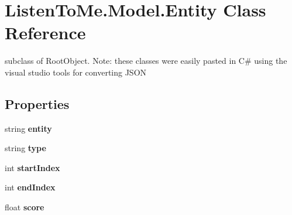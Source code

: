 \hypertarget{class_listen_to_me_1_1_model_1_1_entity}{}\section{Listen\+To\+Me.\+Model.\+Entity Class Reference}
\label{class_listen_to_me_1_1_model_1_1_entity}


subclass of Root\+Object. Note\+: these classes were easily pasted in C\# using the visual studio tools for converting J\+S\+ON  


\subsection*{Properties}
\begin{DoxyCompactItemize}
\item 
string {\bfseries entity}\hypertarget{class_listen_to_me_1_1_model_1_1_entity_a4ae17435557f0e0ec97ff0a93f791f63}{}\label{class_listen_to_me_1_1_model_1_1_entity_a4ae17435557f0e0ec97ff0a93f791f63}

\item 
string {\bfseries type}\hypertarget{class_listen_to_me_1_1_model_1_1_entity_af2daeab3bb0f1ec71b0664aad418ac65}{}\label{class_listen_to_me_1_1_model_1_1_entity_af2daeab3bb0f1ec71b0664aad418ac65}

\item 
int {\bfseries start\+Index}\hypertarget{class_listen_to_me_1_1_model_1_1_entity_a32c85bf1ead96ed642a8164fb425c274}{}\label{class_listen_to_me_1_1_model_1_1_entity_a32c85bf1ead96ed642a8164fb425c274}

\item 
int {\bfseries end\+Index}\hypertarget{class_listen_to_me_1_1_model_1_1_entity_ab4fe7e4a09235bbf2715a3049cba3efb}{}\label{class_listen_to_me_1_1_model_1_1_entity_ab4fe7e4a09235bbf2715a3049cba3efb}

\item 
float {\bfseries score}\hypertarget{class_listen_to_me_1_1_model_1_1_entity_aed4873738d141be126a637073cae179a}{}\label{class_listen_to_me_1_1_model_1_1_entity_aed4873738d141be126a637073cae179a}

\end{DoxyCompactItemize}


